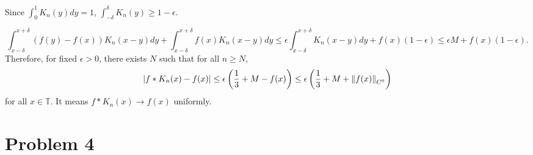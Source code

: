 \documentclass{article}
\begin{document}
Since $\int_0^1 K_n(y)dy=1$, $\int_{-\delta}^{\delta} K_n(y)\geq 1-\epsilon$.

\begin{equation*}
\int_{x-\delta}^{x+\delta} (f(y)-f(x)) K_n(x-y) dy + \int_{x-\delta}^{x+\delta}f(x)K_n(x-y) dy \leq \epsilon \int_{x-\delta}^{x+\delta} K_n(x-y) dy + f(x)(1-\epsilon) \leq \epsilon M + f(x)(1-\epsilon).
\end{equation*}
Therefore, for fixed $\epsilon>0$, there exists $N$ such that for all $n\geq N$,
\begin{equation*}
\abs{f*K_n(x)-f(x)}\leq \epsilon\left(\frac{1}{3}+M-f(x)\right)\leq  \epsilon\left(\frac{1}{3}+M+\norm{f(x)}_{C^0}\right)
\end{equation*}
for all $x\in \mathbb{T}$. It means $f*K_n(x)\rightarrow f(x)$ uniformly.
\section*{Problem 4}
\end{document}
